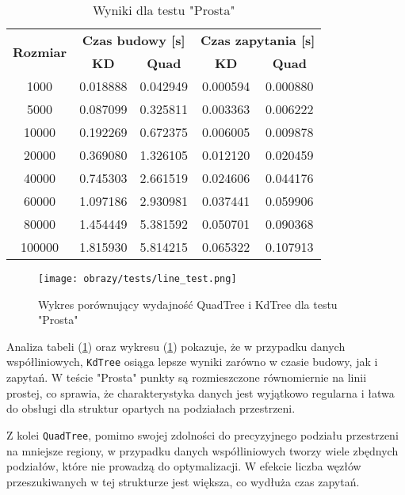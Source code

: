 \documentclass[12pt]{article}
\begin{document}
\begin{table}[h]
\centering
\caption{Wyniki dla testu "Prosta"}
\label{tab:line_test}
\begin{tabular}{ccccc}
\toprule
\multirow{2}{*}{\textbf{Rozmiar}} & \multicolumn{2}{c}{\textbf{Czas budowy [s]}} & \multicolumn{2}{c}{\textbf{Czas zapytania [s]}} \\
\cmidrule(lr){2-3} \cmidrule(lr){4-5}
 & \textbf{KD} & \textbf{Quad} & \textbf{KD} & \textbf{Quad} \\
\midrule
1000   & 0.018888 & 0.042949 & 0.000594 & 0.000880 \\
5000   & 0.087099 & 0.325811 & 0.003363 & 0.006222 \\
10000  & 0.192269 & 0.672375 & 0.006005 & 0.009878 \\
20000  & 0.369080 & 1.326105 & 0.012120 & 0.020459 \\
40000  & 0.745303 & 2.661519 & 0.024606 & 0.044176 \\
60000  & 1.097186 & 2.930981 & 0.037441 & 0.059906 \\
80000  & 1.454449 & 5.381592 & 0.050701 & 0.090368 \\
100000 & 1.815930 & 5.814215 & 0.065322 & 0.107913 \\
\bottomrule
\end{tabular}
\end{table}

\begin{figure}[h]
    \centering
    \texttt{[image: obrazy/tests/line\_test.png]}
    \caption{Wykres porównujący wydajność QuadTree i KdTree dla testu "Prosta"}
    \label{fig:line_tests}
\end{figure}

\newpage
\noindent Analiza tabeli (\ref{tab:line_test}) oraz wykresu (\ref{fig:line_tests}) pokazuje, że w przypadku danych współliniowych, \texttt{KdTree} osiąga lepsze wyniki zarówno w czasie budowy, jak i zapytań. W teście "Prosta" punkty są rozmieszczone równomiernie na linii prostej, co sprawia, że charakterystyka danych jest wyjątkowo regularna i łatwa do obsługi dla struktur opartych na podziałach przestrzeni.

\noindent Z kolei \texttt{QuadTree}, pomimo swojej zdolności do precyzyjnego podziału przestrzeni na mniejsze regiony, w przypadku danych współliniowych tworzy wiele zbędnych podziałów, które nie prowadzą do optymalizacji. W efekcie liczba węzłów przeszukiwanych w tej strukturze jest większa, co wydłuża czas zapytań.

\newpage
\end{document}
